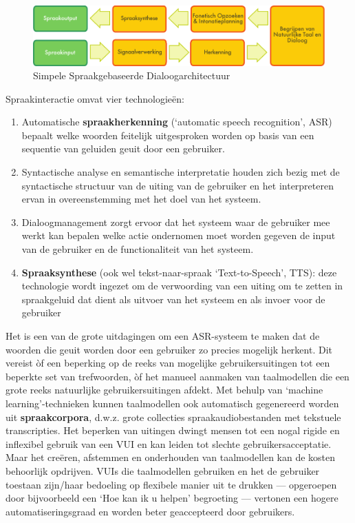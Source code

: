 \documentclass[]{../../metanetpaper}
\begin{document}
\begin{multicols}{2}
\begin{figure}[htb]
  \center  \includegraphics[width=\textwidth]{../_media/dutch/simple_speech-based_dialogue_architecture}
  \center
  \caption{Simpele Spraakgebaseerde Dialoogarchitectuur}
  \label{fig:dialoguearch_de}
\end{figure}

    Spraakinteractie omvat vier technologie{\"e}n:
    \begin{enumerate}
    \item Automatische \textbf{spraakherkenning} (`automatic speech recognition', ASR) bepaalt welke woorden feitelijk uitgesproken worden op basis van een sequentie van geluiden geuit door een gebruiker.
 	\item Syntactische analyse en semantische interpretatie houden zich bezig met de syntactische structuur van de uiting van de gebruiker en het interpreteren ervan in overeenstemming met het doel van het systeem.
 	\item Dialoogmanagement zorgt ervoor dat het systeem waar de gebruiker mee werkt kan bepalen welke actie ondernomen moet worden gegeven de input van de gebruiker en de functionaliteit van het systeem.
 	\item \textbf{Spraaksynthese} (ook wel tekst-naar-spraak `Text-to-Speech', TTS): deze technologie wordt ingezet om de verwoording van een uiting om te zetten in spraakgeluid dat dient als uitvoer van het systeem en als invoer voor de gebruiker
    \end{enumerate}

    Het is een van de grote uitdagingen om een ASR-systeem te maken dat de woorden die geuit worden door een gebruiker zo precies mogelijk herkent.  Dit vereist {\`o}f een beperking op de reeks van mogelijke gebruikersuitingen tot een beperkte set van trefwoorden, {\`o}f het manueel aanmaken van taalmodellen die een grote reeks natuurlijke gebruikersuitingen afdekt. Met behulp van `machine learning'-technieken kunnen taalmodellen ook automatisch gegenereerd worden uit \textbf{spraakcorpora}, d.w.z. grote collecties spraakaudiobestanden met tekstuele transcripties. Het beperken van uitingen dwingt mensen tot een nogal rigide en inflexibel gebruik van een VUI en kan leiden tot slechte gebruikersacceptatie. Maar het cre{\"e}ren, afstemmen en onderhouden van taalmodellen kan de kosten behoorlijk opdrijven. VUIs die taalmodellen gebruiken en het de gebruiker toestaan zijn/haar bedoeling op flexibele manier uit te drukken --- opgeroepen door bijvoorbeeld een `Hoe kan ik u helpen' begroeting --- vertonen een hogere automatiseringsgraad en worden beter geaccepteerd door gebruikers.


\end{multicols}
\end{document}
